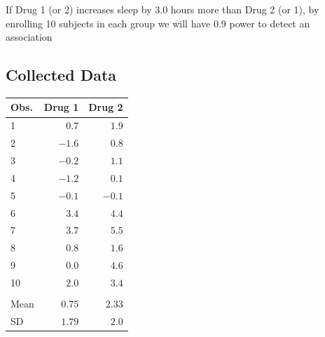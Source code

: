 \bi
\item If Drug 1 (or 2) increases sleep by 3.0 hours more than Drug 2 (or 1), by enrolling 10 subjects in each group we will have 0.9 power to detect an association
\ei

\subsection{Collected Data}
\begin{table}[!hbp]
 \begin{center}
 \begin{tabular}{lrr}\hline\hline
Obs. & \multicolumn{1}{c}{Drug 1}&
\multicolumn{1}{c}{Drug 2}
\\ \hline
1 & $ 0.7$&$ 1.9$\\
2 & $-1.6$&$ 0.8$\\
3 & $-0.2$&$ 1.1$\\
4 & $-1.2$&$ 0.1$\\
5 & $-0.1$&$-0.1$\\
6 & $ 3.4$&$ 4.4$\\
7 & $ 3.7$&$ 5.5$\\
8 & $ 0.8$&$ 1.6$\\
9 & $ 0.0$&$ 4.6$\\
10 & $ 2.0$&$ 3.4$\\
& & \\
Mean & $ 0.75$&$ 2.33$\\
SD & $ 1.79$&$ 2.0$\\
\hline
\end{tabular}
\end{center}
\end{table}

